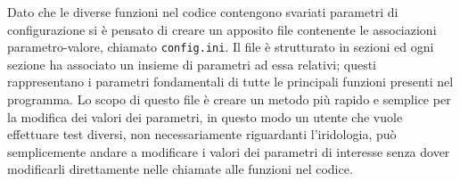 Dato che le diverse funzioni nel codice contengono svariati parametri di configurazione si è pensato di creare un apposito file contenente le associazioni parametro-valore, chiamato \texttt{config.ini}. Il file è strutturato in sezioni ed ogni sezione ha associato un insieme di parametri ad essa relativi; questi rappresentano i parametri fondamentali di tutte le principali funzioni presenti nel programma. Lo scopo di questo file è creare un metodo più rapido e semplice per la modifica dei valori dei parametri, in questo modo un utente che vuole effettuare test diversi, non necessariamente riguardanti l’iridologia, può semplicemente andare a modificare i valori dei parametri di interesse senza dover modificarli direttamente nelle chiamate alle funzioni nel codice.
